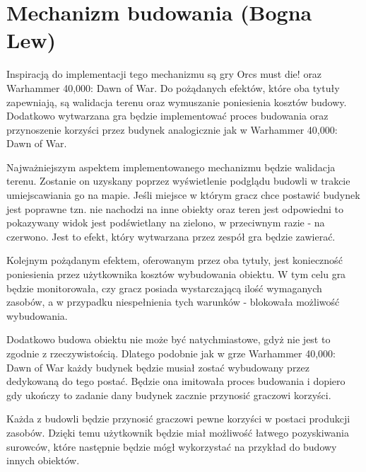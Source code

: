 \section{Mechanizm budowania (Bogna Lew)}\label{chap:build}
Inspiracją do implementacji tego mechanizmu są gry Orcs must die! oraz Warhammer 40,000: Dawn of War. Do pożądanych
efektów, które oba tytuły zapewniają, są walidacja terenu oraz wymuszanie poniesienia kosztów budowy. Dodatkowo
wytwarzana gra będzie implementować proces budowania oraz przynoszenie korzyści przez budynek analogicznie jak w
Warhammer 40,000: Dawn of War.

Najważniejszym aspektem implementowanego mechanizmu będzie walidacja terenu. Zostanie on uzyskany poprzez wyświetlenie
podglądu budowli w trakcie umiejscawiania go na mapie. Jeśli miejsce w którym gracz chce postawić budynek jest poprawne
tzn. nie nachodzi na inne obiekty oraz teren jest odpowiedni to pokazywany widok jest podświetlany na zielono, w
przeciwnym razie - na czerwono. Jest to efekt, który wytwarzana przez zespół gra będzie zawierać.

Kolejnym pożądanym efektem, oferowanym przez oba tytuły, jest konieczność poniesienia przez użytkownika kosztów
wybudowania obiektu. W tym celu gra będzie monitorowała, czy gracz posiada wystarczającą ilość wymaganych zasobów, a w
przypadku niespełnienia tych warunków - blokowała możliwość wybudowania.

Dodatkowo budowa obiektu nie może być natychmiastowe, gdyż nie jest to zgodnie z rzeczywistością. Dlatego podobnie jak w
grze Warhammer 40,000: Dawn of War każdy budynek będzie musiał zostać wybudowany przez dedykowaną do tego postać. Będzie
ona imitowała proces budowania i dopiero gdy ukończy to zadanie dany budynek zacznie przynosić graczowi korzyści.

Każda z budowli będzie przynosić graczowi pewne korzyści w postaci produkcji zasobów. Dzięki temu użytkownik będzie miał
możliwość łatwego pozyskiwania surowców, które następnie będzie mógł wykorzystać na przykład do budowy innych obiektów.
